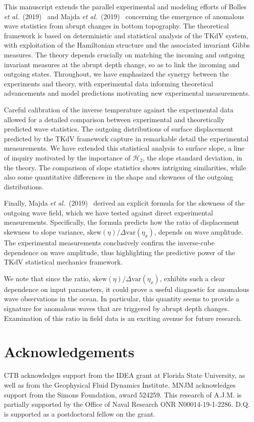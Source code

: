 \documentclass[11pt]{article}
\newcommand{\skw}{\text{skew}}
\newcommand{\var}{\text{var}}
\newcommand{\Ham}{\mathcal{H}}
\newcommand{\Htwo}{\Ham_{2}}
\newcommand{\boetal}{Bolles {\it et al.}~(2019)~}
\newcommand{\maetal}{Majda {\it et al.}~(2019)~}
\begin{document}
	This manuscript extends the parallel experimental and modeling efforts of \boetal \cite{bolles2019} and \maetal \cite{majda2019} concerning the emergence of anomalous wave statistics from abrupt changes in bottom topography. The theoretical framework is based on deterministic and statistical analysis of the TKdV system, with exploitation of the Hamiltonian structure and the associated invariant Gibbs measures. The theory depends crucially on matching the incoming and outgoing invariant measures at the abrupt depth change, so as to link the incoming and outgoing states. Throughout, we have emphasized the synergy between the experiments and theory, with experimental data informing theoretical advancements and model predictions motivating new experimental measurements.
	
	Careful calibration of the inverse temperature against the experimental data allowed for a detailed comparison between experimental and theoretically predicted wave statistics. The outgoing distributions of surface displacement predicted by the TKdV framework capture in remarkable detail the experimental measurements. We have extended this statistical analysis to surface slope, a line of inquiry motivated by the importance of $\Htwo$, the slope standard deviation, in the theory. The comparison of slope statistics shows intriguing similarities, while also some quantitative differences in the shape and skewness of the outgoing distributions.
	
	Finally, \maetal \cite{majda2019} derived an explicit formula for the skewness of the outgoing wave field, which we have tested against direct experimental measurements. Specifically, the formula predicts how the ratio of displacement skewness to slope variance, $\skw(\eta) / \Delta \var(\eta_x)$, depends on wave amplitude. The experimental measurements conclusively confirm the inverse-cube dependence on wave amplitude, thus highlighting the predictive power of the TKdV statistical mechanics framework.
	
	We note that since the ratio, $\skw(\eta) / \Delta \var(\eta_x)$, exhibits such a clear dependence on input parameters, it could prove a useful diagnostic for anomalous wave observations in the ocean. In particular, this quantity seems to provide a signature for anomalous waves that are triggered by abrupt depth changes. Examination of this ratio in field data is an exciting avenue for future research.


\section*{Acknowledgements}
CTB acknowledges support from the IDEA grant at Florida State University, as well as from the Geophysical Fluid Dynamics Institute. 
MNJM acknowledges support from the Simons Foundation, award 524259. 
This research of A.J.M. is partially supported by the Office of Naval Research ONR N00014-19-1-2286.
D.Q. is supported as a postdoctoral fellow on the grant.



\end{document}
